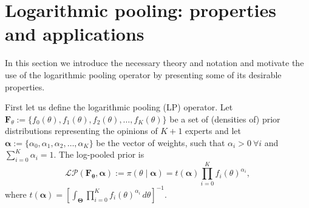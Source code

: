 \documentclass[a4paper, notitlepage, 10pt]{article}
\begin{document}
\section{Logarithmic pooling: properties and applications}
\label{sec:background}

In this section we introduce the necessary theory and notation and motivate the use of the logarithmic pooling operator by presenting some of its desirable properties.

First let us define the logarithmic pooling (LP) operator.
Let $\mathbf{F}_{\theta} := \{f_0(\theta), f_1(\theta), f_2(\theta), \ldots, f_K(\theta)\}$ be a set of (densities of) prior distributions representing the opinions of $K+1$ experts and let $\boldsymbol\alpha :=\{\alpha_0, \alpha_1, \alpha_2, \ldots, \alpha_K \}$ be the vector of weights, such that $\alpha_i > 0\: \forall i$ and $\sum_{i=0}^K \alpha_i = 1$.
The log-pooled prior is
\begin{equation}
\label{eq:logpool}
 \mathcal{LP}(\mathbf{F_\theta}, \boldsymbol\alpha) := \pi(\theta \mid \boldsymbol\alpha) = t(\boldsymbol\alpha) \prod_{i=0}^K f_i(\theta)^{\alpha_i},
\end{equation}
where $t(\boldsymbol\alpha) = \left[ \int_{\boldsymbol\Theta}\prod_{i=0}^K f_i(\theta)^{\alpha_i}\, d\theta \right]^{-1}$.
\end{document}

